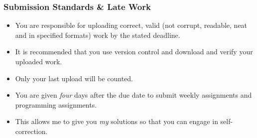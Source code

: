 \begin{frame}
  \frametitle{Submission Standards \& Late Work}

  \begin{itemize}
  \item You are responsible for uploading correct, valid (not corrupt, readable, neat and in specified formats) work by the stated deadline.
    \item It is recommended that you use \alert{version control} and \alert{download and verify} your uploaded work.
  \item Only your last upload will be counted.
  \item You are given \emph{four} days after the due date to submit weekly assignments and programming assignments.
  \item This allows me to give you \emph{my} solutions so that you can engage in self-correction.
  \end{itemize}
  
\end{frame}
